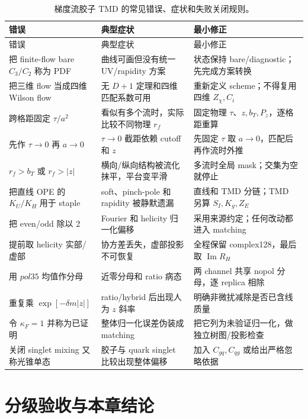 \begin{longtable}{@{}p{}p{}p{}@{}}
\caption{梯度流胶子 TMD 的常见错误、症状和失败关闭规则。}\label{tab:b06-failures}\\
\toprule
错误 & 典型症状 & 最小修正 \\
\midrule
\endfirsthead
\toprule
错误 & 典型症状 & 最小修正 \\
\midrule
\endhead
把 finite-flow bare \(C_3/C_2\) 称为 PDF & 曲线可画但没有统一 UV/rapidity 方案 & 状态保持 bare/diagnostic；先完成方案转换 \\
把三维 flow 当成四维 Wilson flow & 无 \(D+1\) 定理和四维匹配系数可用 & 重新定义 scheme；不得复用四维 \(Z_\chi,C_i\) \\
跨格距固定 \(\tau/a^2\) & 看似有多个流时，实际比较不同物理 \(r_f\) & 固定物理 \(\tau\)、\(z,b_T,P_z\)，逐格距重算 \\
先作 \(\tau\to0\) 再 \(a\to0\) & \(\tau\to0\) 截距依赖 cutoff 和 \(z\) & 先固定 \(\tau\) 取 \(a\to0\)，匹配后再作流时外推 \\
\(r_f>b_T\) 或 \(r_f>|z|\) & 横向/纵向结构被流化抹平，平台变平滑 & 多流时全局 mask；交集为空就停止 \\
把直线 OPE 的 \(K_U/K_H\) 用于 staple & soft、pinch-pole 和 rapidity 被静默遗漏 & 直线和 TMD 分链；TMD 另算 \(S_I,K_g,Z_E\) \\
把 even/odd 除以 2 & Fourier 和 helicity 归一化偏移 & 采用来源约定；任何改动都进入 matching \\
提前取 helicity 实部/虚部 & 协方差丢失，虚部投影不可恢复 & 全程保留 complex128，最后取 \(\operatorname{Im}R_H\) \\
用 \(pol35\) 均值作分母 & 近零分母和 ratio 病态 & 两 channel 共享 nopol 分母，逐 replica 相除 \\
重复乘 \(\exp[-\delta m|z|]\) & ratio/hybrid 后出现人为 \(z\) 斜率 & 明确非微扰减除是否已含线质量 \\
令 \(\kappa_F=1\) 并称为已证明 & 整体归一化误差伪装成 matching & 把它列为未验证归一化，做独立树图/投影检查 \\
关闭 singlet mixing 又称光锥单态 & 胶子与 quark singlet 比较出现整体偏移 & 加入 \(C_{gq},C_{qg}\) 或给出严格忽略依据 \\
\bottomrule
\end{longtable}

\section{分级验收与本章结论}

